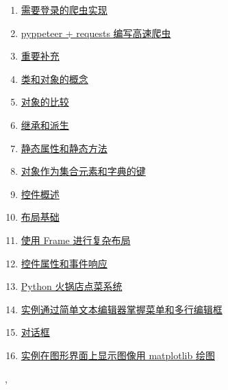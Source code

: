 \documentclass[11pt]{article}
\renewcommand{\today}{\shortmonthname[\the\month] \the \day,  \the\year}
\begin{document}
\begin{multicols}{2}
\begin{enumerate}
		\item  \href{https://mp.weixin.qq.com/s/Ln6QvgVXXlB1C62CXbQ8tA }{需要登录的爬虫实现} %
		\item  \href{https://mp.weixin.qq.com/s/ft9Fx5U9s7EWrRrEOep63A}{pyppeteer + requests 编写高速爬虫} %
		\item  \href{https://mp.weixin.qq.com/s/_hu1tfogmrEvsuvyALoE1w}{重要补充} %
		\item  \href{https://mp.weixin.qq.com/s/R7AzcyNDlQdSIqPfx8HtVg}{类和对象的概念} %
		\item  \href{https://mp.weixin.qq.com/s/LdJx0qQ-Fd65enpLn1kTkQ}{对象的比较} %
		\item  \href{https://mp.weixin.qq.com/s/r0k7yHdu1Ur3bOX4YhLT9w}{继承和派生} %
		\item  \href{https://mp.weixin.qq.com/s/HXkVEyPEmYLLP366LnsFyQ}{静态属性和静态方法} %
		\item  \href{https://mp.weixin.qq.com/s/feV_lZUZojEHiLvf5630SA}{对象作为集合元素和字典的键} %
		\item  \href{https://mp.weixin.qq.com/s/z8HypCqIP4FzvqBHRm9UUA}{控件概述} %
		\item  \href{https://mp.weixin.qq.com/s/qfMZ26-oW28OKKPfBCEGDw}{布局基础} %
		\item  \href{https://mp.weixin.qq.com/s/R2SXCg7rc6FpCQKkw_lpyg}{使用 Frame 进行复杂布局} %
		\item  \href{https://mp.weixin.qq.com/s/n-YPIBUG-BIRIJjWrFg2Gg}{控件属性和事件响应} %
		\item  \href{https://mp.weixin.qq.com/s/1t1M8XvzxY-9xDvd51H4ZA}{Python 火锅店点菜系统} %
		\item  \href{https://mp.weixin.qq.com/s/fA-Wb1WSkhekZi3pmbhLlA}{实例通过简单文本编辑器掌握菜单和多行编辑框} %
		\item  \href{https://mp.weixin.qq.com/s/pBlOfPp0_ZGDRu0ocFWefQ}{对话框} %
		\item  \href{https://mp.weixin.qq.com/s/DBsUrAVoPyOdfbi3r9yeog}{实例在图形界面上显示图像用 matplotlib 绘图} %
	\end{enumerate}
\end{multicols}






%
\begin{flushright}
	\tiny \today 
\end{flushright}
\end{document}

